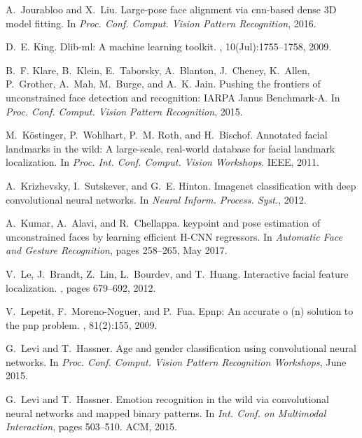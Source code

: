 \documentclass[10pt,twocolumn,letterpaper]{article}
\begin{document}
{\begin{thebibliography}{10}
A.~Jourabloo and X.~Liu.
\newblock Large-pose face alignment via cnn-based dense {3D} model fitting.
\newblock In {\em Proc. Conf. Comput. Vision Pattern Recognition}, 2016.

D.~E. King.
\newblock Dlib-ml: A machine learning toolkit.
, 10(Jul):1755--1758, 2009.

B.~F. Klare, B.~Klein, E.~Taborsky, A.~Blanton, J.~Cheney, K.~Allen,
  P.~Grother, A.~Mah, M.~Burge, and A.~K. Jain.
\newblock Pushing the frontiers of unconstrained face detection and
  recognition: {IARPA} {J}anus {B}enchmark-{A}.
\newblock In {\em Proc. Conf. Comput. Vision Pattern Recognition}, 2015.

M.~K{\"o}stinger, P.~Wohlhart, P.~M. Roth, and H.~Bischof.
\newblock Annotated facial landmarks in the wild: A large-scale, real-world
  database for facial landmark localization.
\newblock In {\em Proc. Int. Conf. Comput. Vision Workshops}. IEEE, 2011.

A.~Krizhevsky, I.~Sutskever, and G.~E. Hinton.
\newblock Imagenet classification with deep convolutional neural networks.
\newblock In {\em Neural Inform. Process. Syst.}, 2012.

A.~Kumar, A.~Alavi, and R.~Chellappa.
 keypoint and pose estimation of unconstrained faces by
  learning efficient {H-CNN} regressors.
\newblock In {\em Automatic Face and Gesture Recognition}, pages 258--265, May
  2017.

V.~Le, J.~Brandt, Z.~Lin, L.~Bourdev, and T.~Huang.
\newblock Interactive facial feature localization.
, pages 679--692, 2012.

V.~Lepetit, F.~Moreno-Noguer, and P.~Fua.
\newblock Epnp: An accurate o (n) solution to the pnp problem.
, 81(2):155, 2009.

G.~Levi and T.~Hassner.
\newblock Age and gender classification using convolutional neural networks.
\newblock In {\em Proc. Conf. Comput. Vision Pattern Recognition Workshops},
  June 2015.

G.~Levi and T.~Hassner.
\newblock Emotion recognition in the wild via convolutional neural networks and
  mapped binary patterns.
\newblock In {\em Int. Conf. on Multimodal Interaction}, pages 503--510. ACM,
  2015.


\end{thebibliography}}
\end{document}
